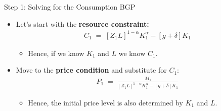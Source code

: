\documentclass[10pt,c,aspectratio=1610,handout]{beamer}
\begin{document}
\begin{frame}{Step 1: Solving for the Consumption BGP}%
  \begin{itemize}%
    \item[$\blacktriangleright$] Let's start with the \textbf{resource constraint:}%
    \begin{align*}%
      C_{1} \; = \; \left[ Z_{1} L \right]^{1-\alpha} K_{1}^{\alpha} - \left[ g+\delta \right] K_{1}%
    \end{align*}%
    \vspace*{-0.15in}%
    \begin{itemize}%
      \item[$\rightarrow$] Hence, if we know $K_{1}$ and $L$ we know $C_{1}$.%
    \end{itemize}%
    \vspace*{0.3in}%
    \pause%
    \item[$\blacktriangleright$] Move to the \textbf{price condition} and substitute for $C_{1}$:%
    \begin{align*}%
      P_{1} \; = \; \frac{M_{1}}{\left[ Z_{1} L \right]^{1-\alpha} K_{1}^{\alpha} - \left[ g+\delta \right] K_{1}}%
    \end{align*}%
    \vspace*{-0.15in}%
    \begin{itemize}%
      \item[$\rightarrow$] Hence, the initial price level is also determined by $K_{1}$ and $L$.%
    \end{itemize}%
  \end{itemize}%
\end{frame}%
\end{document}
